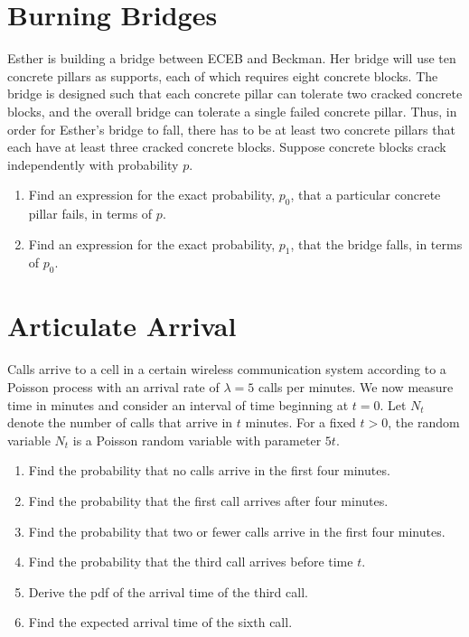 \documentclass{article}
\begin{document}
\section{Burning Bridges}

Esther is building a bridge between ECEB and Beckman. Her bridge will use ten concrete pillars as supports, each of which requires eight concrete blocks. The bridge is designed such that each concrete pillar can tolerate two cracked concrete blocks, and the overall bridge can tolerate a single failed concrete pillar. Thus, in order for Esther's bridge to fall, there has to be at least two concrete pillars that each have at least three cracked concrete blocks. Suppose concrete blocks crack independently with probability $p$.

\begin{enumerate}[label=(\alph*)]
\itemsep0em
    \item Find an expression for the exact probability, $p_0$, that a particular concrete pillar fails, in terms of $p$.\vfill
    \item Find an expression for the exact probability, $p_1$, that the bridge falls, in terms of $p_0$.\vfill
\end{enumerate}

\newpage

\section{Articulate Arrival}

Calls arrive to a cell in a certain wireless communication system according to a Poisson process with an arrival rate of $\lambda = 5$ calls per minutes. We now measure time in minutes and consider an interval of time beginning at $t = 0$. Let $N_t$ denote the number of calls that arrive in $t$ minutes. For a fixed $t > 0$, the random variable $N_t$ is a Poisson random variable with parameter $5t$.

\begin{enumerate}[label=(\alph*)]
\itemsep0em
    \item Find the probability that no calls arrive in the first four minutes.\vfill
    \item Find the probability that the first call arrives after four minutes.\vfill
    \item Find the probability that two or fewer calls arrive in the first four minutes.\vfill
    \item Find the probability that the third call arrives before time $t$.\vfill
    \item Derive the pdf of the arrival time of the third call.\vfill
    \item Find the expected arrival time of the sixth call.\vfill
\end{enumerate}
\end{document}
